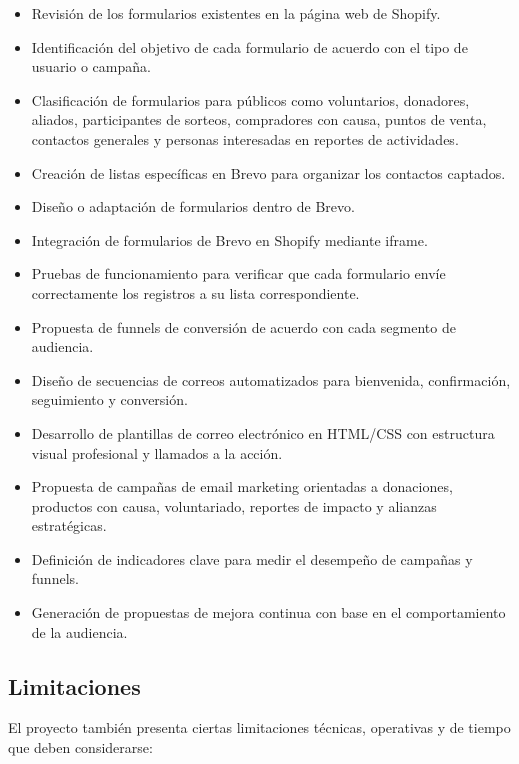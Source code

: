 \begin{itemize}
    \item Revisión de los formularios existentes en la página web de Shopify.
    \item Identificación del objetivo de cada formulario de acuerdo con el tipo de usuario o campaña.
    \item Clasificación de formularios para públicos como voluntarios, donadores, aliados, participantes de sorteos, compradores con causa, puntos de venta, contactos generales y personas interesadas en reportes de actividades.
    \item Creación de listas específicas en Brevo para organizar los contactos captados.
    \item Diseño o adaptación de formularios dentro de Brevo.
    \item Integración de formularios de Brevo en Shopify mediante iframe.
    \item Pruebas de funcionamiento para verificar que cada formulario envíe correctamente los registros a su lista correspondiente.
    \item Propuesta de funnels de conversión de acuerdo con cada segmento de audiencia.
    \item Diseño de secuencias de correos automatizados para bienvenida, confirmación, seguimiento y conversión.
    \item Desarrollo de plantillas de correo electrónico en HTML/CSS con estructura visual profesional y llamados a la acción.
    \item Propuesta de campañas de email marketing orientadas a donaciones, productos con causa, voluntariado, reportes de impacto y alianzas estratégicas.
    \item Definición de indicadores clave para medir el desempeño de campañas y funnels.
    \item Generación de propuestas de mejora continua con base en el comportamiento de la audiencia.
\end{itemize}

\subsection{Limitaciones}

El proyecto también presenta ciertas limitaciones técnicas, operativas y de tiempo que deben considerarse:

